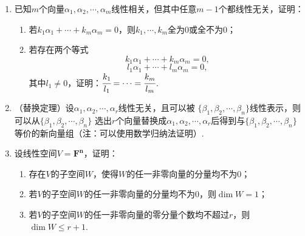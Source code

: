 \begin{enumerate}
	\item 已知$m$个向量$\alpha_1,\alpha_2,\cdots,\alpha_m$线性相关，但其中任意$m-1$个都线性无关，证明：
	\begin{enumerate}
        \item 若$k_1\alpha_1+\cdots+k_m\alpha_m=0$，则$k_1,\cdots,k_m$全为0或全不为0；
        \item 若存在两个等式
        \[k_1\alpha_1+\cdots+k_m\alpha_m=0,\]
        \[l_1\alpha_1+\cdots+l_m\alpha_m=0,\]
        其中$l_1\neq 0$，证明：$\cfrac{k_1}{l_1}=\cdots=\cfrac{k_m}{l_m}$.
    \end{enumerate}
    \item （替换定理）设$\alpha_1,\alpha_2,\cdots,\alpha_r$线性无关，且可以被
	$\{\beta_1,\beta_2,\cdots,\beta_n\}$线性表示，则可以从$\{\beta_1,\beta_2,\cdots,\beta_n\}$
	选出$r$个向量替换成$\alpha_1,\alpha_2,\cdots,\alpha_r$后得到与$\{\beta_1,\beta_2,\cdots,\beta_n\}$
	等价的新向量组（注：可以使用数学归纳法证明）.
	\item 设线性空间$V=\mathbf{F^n}$，证明：
	\begin{enumerate}[label=(\arabic*)]
        \item 存在$V$的子空间$W$，使得$W$的任一非零向量的分量均不为0；
        \item 若$V$的子空间$W$的任一非零向量的分量均不为0，则$\dim W=1$；
        \item 若$V$的子空间$W$的任一非零向量的零分量个数均不超过$r$，则$\dim W \le r+1$.
    \end{enumerate}
\end{enumerate}
